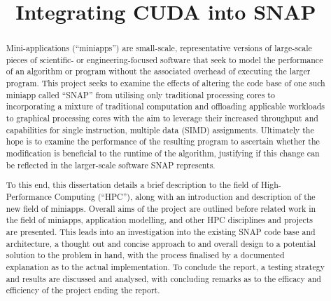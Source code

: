 \documentclass[conference]{IEEEtran}
\begin{document}
\title{Integrating CUDA into SNAP}


\author{
}


\maketitle


\begin{abstract}

Mini-applications (``miniapps'') are small-scale, representative versions of large-scale pieces of scientific- or engineering-focused software that seek to model the performance of an algorithm or program without the associated overhead of executing the larger program. This project seeks to examine the effects of altering the code base of one such miniapp called ``SNAP'' from utilising only traditional processing cores to incorporating a mixture of traditional computation and offloading applicable workloads to graphical processing cores with the aim to leverage their increased throughput and capabilities for single instruction, multiple data (SIMD) assignments. Ultimately the hope is to examine the performance of the resulting program to ascertain whether the modification is beneficial to the runtime of the algorithm, justifying if this change can be reflected in the larger-scale software SNAP represents.

To this end, this dissertation details a brief description to the field of High-Performance Computing (``HPC''), along with an introduction and description of the new field of miniapps. Overall aims of the project are outlined before related work in the field of miniapps, application modelling, and other HPC disciplines and projects are presented. This leads into an investigation into the existing SNAP code base and architecture, a thought out and concise approach to and overall design to a potential solution to the problem in hand, with the process finalised by a documented explanation as to the actual implementation. To conclude the report, a testing strategy and results are discussed and analysed, with concluding remarks as to the efficacy and efficiency of the project ending the report.

\end{abstract}

\end{document}
